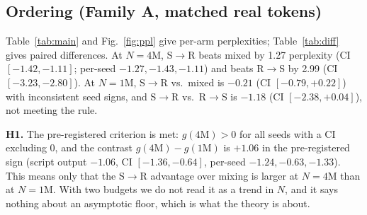 \documentclass[conference]{IEEEtran}
\newcommand{\SR}{S$\to$R}
\newcommand{\RS}{R$\to$S}
\begin{document}
\subsection{Ordering (Family A, matched real tokens)}
Table~\ref{tab:main} and Fig.~\ref{fig:ppl} give per-arm perplexities; Table~\ref{tab:diff} gives paired differences. At $N{=}4$M, \SR{} beats mixed by 1.27 perplexity (CI $[-1.42,-1.11]$; per-seed $-1.27,-1.43,-1.11$) and beats \RS{} by 2.99 (CI $[-3.23,-2.80]$). At $N{=}1$M, \SR{} vs.\ mixed is $-0.21$ (CI $[-0.79,+0.22]$) with inconsistent seed signs, and \SR{} vs.\ \RS{} is $-1.18$ (CI $[-2.38,+0.04]$), not meeting the rule.

\textbf{H1.} The pre-registered criterion is met: $g(4\text{M})>0$ for all seeds with a CI excluding 0, and the contrast $g(4\text{M})-g(1\text{M})$ is $+1.06$ in the pre-registered sign (script output $-1.06$, CI $[-1.36,-0.64]$, per-seed $-1.24,-0.63,-1.33$). This means only that the \SR{} advantage over mixing is larger at $N{=}4$M than at $N{=}1$M. With two budgets we do not read it as a trend in $N$, and it says nothing about an asymptotic floor, which is what the theory is about.
\end{document}
